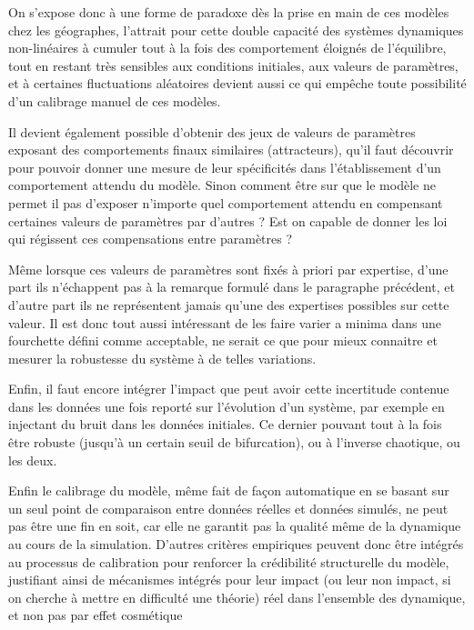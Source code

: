 On s'expose donc à une forme de paradoxe dès la prise en main de ces modèles chez les géographes, l'attrait pour cette double capacité des systèmes dynamiques non-linéaires à cumuler tout à la fois des comportement éloignés de l'équilibre, tout en restant très sensibles aux conditions initiales, aux valeurs de paramètres, et à certaines fluctuations aléatoires devient aussi ce qui empêche toute possibilité d'un calibrage manuel de ces modèles.

Il devient également possible d'obtenir des jeux de valeurs de paramètres exposant des comportements finaux similaires (attracteurs), qu'il faut découvrir pour pouvoir donner une mesure de leur spécificités dans l'établissement d'un comportement attendu du modèle. Sinon comment être sur que le modèle ne permet il pas d'exposer n'importe quel comportement attendu en compensant certaines valeurs de paramètres par d'autres ? Est on capable de donner les loi qui régissent ces compensations entre paramètres ?

Même lorsque ces valeurs de paramètres sont fixés à priori par expertise, d'une part ils n'échappent pas à la remarque formulé dans le paragraphe précédent, et d'autre part ils ne représentent jamais qu'une des expertises possibles sur cette valeur. Il est donc tout aussi intéressant de les faire varier a minima dans une fourchette défini comme acceptable, ne serait ce que pour mieux connaitre et mesurer la robustesse du système à de telles variations.

Enfin, il faut encore intégrer l'impact que peut avoir cette incertitude contenue dans les données une fois reporté sur l'évolution d'un système, par exemple en injectant du bruit dans les données initiales. Ce dernier pouvant tout à la fois être robuste (jusqu'à un certain seuil de bifurcation), ou à l'inverse chaotique, ou les deux.

Enfin le calibrage du modèle, même fait de façon automatique en se basant sur un seul point de comparaison entre données réelles et données simulés, ne peut pas être une fin en soit, car elle ne garantit pas la qualité même de la dynamique au cours de la simulation. D'autres critères empiriques peuvent donc être intégrés au processus de calibration pour renforcer la crédibilité structurelle du modèle, justifiant ainsi de mécanismes intégrés pour leur impact (ou leur non impact, si on cherche à mettre en difficulté une théorie) réel dans l'ensemble des dynamique, et non pas par effet cosmétique \autocites{Hermann1967, Grimm2005,Cottineau2014b}

